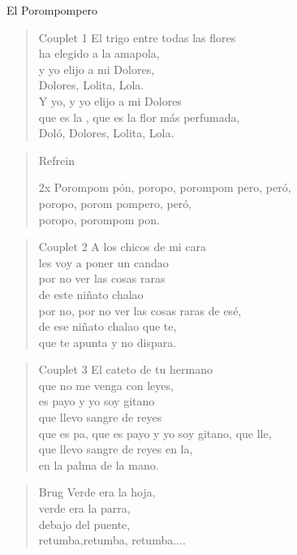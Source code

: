 \begin{song}{El Porompompero}
\begin{verse}{Couplet 1}
El trigo entre todas las flores\\
ha elegido a la amapola,\\
y yo elijo a mi Dolores,\chord{}\\
Dolores, Lolita, Lola.\\
Y yo, y yo elijo a mi Dolores\\
que es la , que es la flor más perfumada,\\
Doló, Dolores, Lolita, Lola.
\end{verse}

\begin{verse}{Refrein}
\begin{sidenote}{2x}
Porompom pón, poropo, porompom pero, peró,\\
poropo, porom pompero, peró,\\
poropo, porompom pon.
\end{sidenote}
\end{verse}

\begin{verse}{Couplet 2}
A los chicos de mi cara\\
les voy a poner un candao\\
por no ver las cosas raras\chord{}\\
de este niñato chalao\\
por no, por no ver las cosas raras de esé,\\
de ese niñato chalao que te,\\
que te apunta y no dispara. 
\end{verse}


\begin{verse}{Couplet 3}
El cateto de tu hermano\\
que no me venga con leyes,\\
es payo y yo soy gitano\chord{}\\
que llevo sangre de reyes\\
que es pa, que es payo y yo soy gitano, que lle,\\
que llevo sangre de reyes en la,\\
en la palma de la mano. \\
\end{verse}


\begin{verse}{Brug}
Verde era la hoja,\\
verde era la parra,\\
debajo del puente,\chord{}\\
retumba,retumba, retumba....\chord{}\\
\end{verse}

\end{song}

